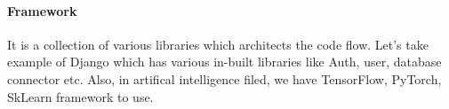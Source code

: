 \documentclass[../main.tex]{subfiles}
\begin{document}
\paragraph{Framework} It is a collection of various libraries which architects the code flow. Let’s take example of Django which has various in-built libraries like Auth, user, database connector etc. Also, in artifical intelligence filed, we have TensorFlow, PyTorch, SkLearn framework to use. 




\end{document}
